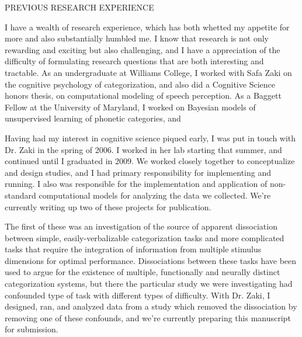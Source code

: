 \documentclass[12pt]{article}
\begin{document}
PREVIOUS RESEARCH EXPERIENCE

I have a wealth of research experience, which has both whetted my appetite for more and also substantially humbled me.  I know that research is not only rewarding and exciting but also challenging, and I have a appreciation of the difficulty of formulating research questions that are both interesting and tractable.  As an undergraduate at Williams College, I worked with Safa Zaki on the cognitive psychology of categorization, and also did a Cognitive Science honors thesis, on computational modeling of speech perception.  As a Baggett Fellow at the University of Maryland, I worked on Bayesian models of unsupervised learning of phonetic categories, and




Having had my interest in cognitive science piqued early, I was put in touch with Dr. Zaki in the spring of 2006.  I worked in her lab starting that summer, and continued until I graduated in 2009.  We worked closely together to conceptualize and design studies, and I had primary responsibility for implementing and running.  I also was responsible for the implementation and application of non-standard computational models for analyzing the data we collected.  We're currently writing up two of these projects for publication.

The first of these was an investigation of the source of apparent dissociation between simple, easily-verbalizable categorization tasks and more complicated tasks that require the integration of information from multiple stimulus dimensions for optimal performance.  Dissociations between these tasks have been used to argue for the existence of multiple, functionally and neurally distinct categorization systems, but there the particular study we were investigating had confounded type of task with different types of difficulty.  With Dr. Zaki, I designed, ran, and analyzed data from a study which removed the dissociation by removing one of these confounds, and we're currently preparing this manuscript for submission.  
\end{document}
